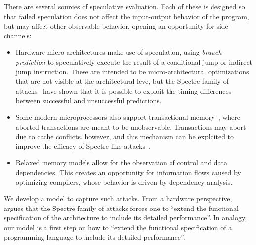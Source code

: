 There are several sources of speculative evaluation.  Each of these is
designed so that failed speculation does not affect the input-output behavior
of the program, but may affect other observable behavior, opening an opportunity
for side-channels:
\begin{itemize}
\item Hardware micro-architectures make use of
  speculation, using \emph{branch prediction}
  to speculatively execute the result of
  a conditional jump or indirect jump instruction.
  These are intended to be micro-architectural optimizations
  that are not visible at the architectural leve, but
  the Spectre family of
  attacks~\cite{DBLP:journals/corr/abs-1801-01203} have shown that it is possible to exploit the timing
  differences between successful and unsuccessful predictions.
\item Some modern microprocessors also support transactional
  memory~\cite{ChongSW18}, where aborted transactions are meant to be
  unobservable.  Transactions may abort due to cache conflicts, however, and
  this mechanism can be exploited to improve the efficacy of Spectre-like
  attacks~\cite{DBLP:conf/uss/DisselkoenKPT17}.
\item Relaxed memory models
  \cite{Manson:2005:JMM:1047659.1040336,Boehm:2008:FCC:1375581.1375591,DBLP:conf/popl/ZhaoNMZ12}
  allow for the observation of control and data dependencies. This creates an
  opportunity for information flows caused by optimizing compilers, whose
  behavior is driven by dependency analysis.
\end{itemize}

We develop a model to capture such attacks.  From a hardware perspective, ~\citet{Chien:2018} argues that  the Spectre family of attacks forces one to
``extend the functional specification of the architecture to include its detailed performance''.    In analogy, our model is a first step on how to ``extend the functional specification of a programming language  to include its detailed performance''.  
%



